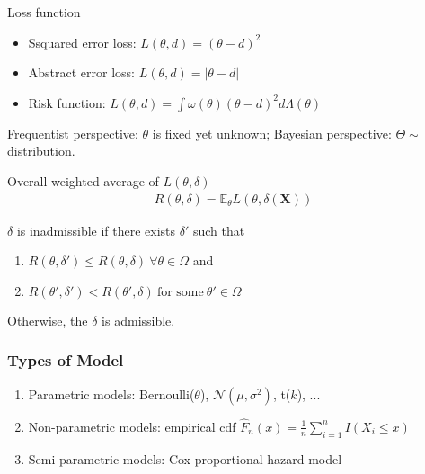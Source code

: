 Loss function
\begin{itemize}
    \item Ssquared error loss: $L(\theta,d)=(\theta-d)^2$
    \item Abstract error loss: $L(\theta,d)=|\theta-d|$
    \item Risk function: 
    $L(\theta,d)=\int{\omega(\theta)(\theta-d)^2d\Lambda(\theta)}$
\end{itemize}

Frequentist perspective: $\theta$ is fixed yet unknown;
Bayesian perspective: $\Theta\sim$ distribution.

\begin{definition}
    Overall weighted average of $L(\theta,\delta)$
    \begin{gather}
        R(\theta, \delta)=\mathbb{E}_\theta L(\theta, \delta(\boldsymbol{X}))
    \end{gather}
\end{definition}

\begin{definition}[Admissibility]
\label{def:admissible}
    $\delta$ is inadmissible if there exists $\delta'$ such that 
    \begin{enumerate}[{(1)}]
        \item $R(\theta, \delta') \leq R(\theta, \delta)~\forall{\theta}\in\Omega$ and 
        \item $R(\theta', \delta') < R(\theta', \delta)~\text{for some}~\theta'\in\Omega$
    \end{enumerate}
    Otherwise, the $\delta$ is admissible.
\end{definition}

\subsubsection{Types of Model}
\begin{enumerate}
    \item Parametric models: Bernoulli($\theta$), $\mathcal{N}(\mu,\sigma^2)$, t($k$), ...
    \item Non-parametric models: empirical cdf $\hat{F}_n(x)=\frac{1}{n}\sum_{i=1}^n{I(X_i\leq{x})}$
    \item Semi-parametric models: Cox proportional hazard model
        
\end{enumerate}


